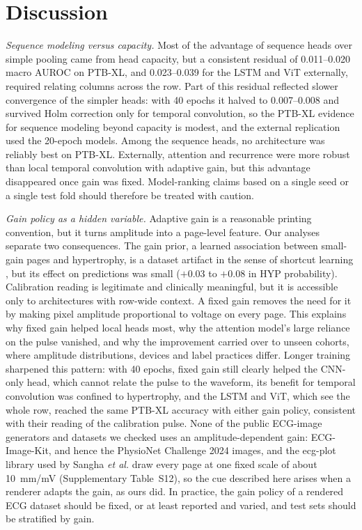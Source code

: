 \documentclass[journal]{IEEEtran}
\begin{document}
\section{Discussion}
\emph{Sequence modeling versus capacity.} Most of the advantage of sequence heads over simple pooling came from head capacity, but a consistent residual of 0.011--0.020 macro AUROC on PTB-XL, and 0.023--0.039 for the LSTM and ViT externally, required relating columns across the row. Part of this residual reflected slower convergence of the simpler heads: with 40 epochs it halved to 0.007--0.008 and survived Holm correction only for temporal convolution, so the PTB-XL evidence for sequence modeling beyond capacity is modest, and the external replication used the 20-epoch models. Among the sequence heads, no architecture was reliably best on PTB-XL. Externally, attention and recurrence were more robust than local temporal convolution with adaptive gain, but this advantage disappeared once gain was fixed. Model-ranking claims based on a single seed or a single test fold should therefore be treated with caution.

\emph{Gain policy as a hidden variable.} Adaptive gain is a reasonable printing convention, but it turns amplitude into a page-level feature. Our analyses separate two consequences. The gain prior, a learned association between small-gain pages and hypertrophy, is a dataset artifact in the sense of shortcut learning \cite{geirhos2020shortcut}, but its effect on predictions was small ($+0.03$ to $+0.08$ in HYP probability). Calibration reading is legitimate and clinically meaningful, but it is accessible only to architectures with row-wide context. A fixed gain removes the need for it by making pixel amplitude proportional to voltage on every page. This explains why fixed gain helped local heads most, why the attention model's large reliance on the pulse vanished, and why the improvement carried over to unseen cohorts, where amplitude distributions, devices and label practices differ. Longer training sharpened this pattern: with 40 epochs, fixed gain still clearly helped the CNN-only head, which cannot relate the pulse to the waveform, its benefit for temporal convolution was confined to hypertrophy, and the LSTM and ViT, which see the whole row, reached the same PTB-XL accuracy with either gain policy, consistent with their reading of the calibration pulse. None of the public ECG-image generators and datasets we checked uses an amplitude-dependent gain: ECG-Image-Kit, and hence the PhysioNet Challenge 2024 images, and the ecg-plot library used by Sangha \emph{et al.} draw every page at one fixed scale of about 10~mm/mV \cite{shivashankara2024ecgimagekit,reyna2024challenge,reyna2024imagedatabase,sangha2022images} (Supplementary Table~S12), so the cue described here arises when a renderer adapts the gain, as ours did. In practice, the gain policy of a rendered ECG dataset should be fixed, or at least reported and varied, and test sets should be stratified by gain.
\end{document}
